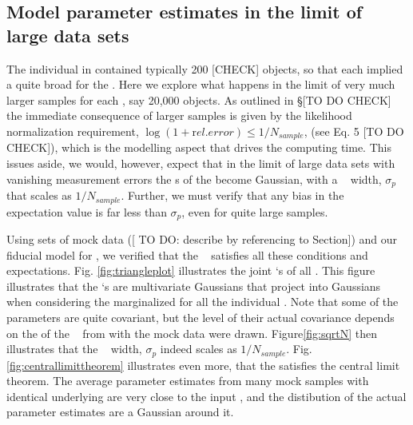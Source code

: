 \subsection{Model parameter estimates in the limit of large data sets} \label{sec:largedata}

The individual \MAP in \citet{bov13} contained typically 200 [CHECK] objects, so that each \MAP implied a quite broad \pdf  for the \pmodel .
Here we explore what happens in the limit of very much larger samples for each \MAP , say 20,000 objects. As outlined in \S [TO DO CHECK] the immediate consequence of larger samples is given by the likelihood normalization requirement, $\log(1+{\mathrm rel. error})\le 1/N_{sample}$, (see Eq. 5 [TO DO CHECK]), which is the modelling aspect that drives the computing time. This issues aside, we would, however, expect that in the limit of large data sets with vanishing measurement errors the \pdf s of the \pmodel become Gaussian, with a \pdf~ width, $\sigma_p$ that scales as $1/N_{sample}$. Further, we must verify that any bias in the \pdf~ expectation value is far less than 
$\sigma_p$, even for quite large samples.

 Using sets of mock data ([ TO DO: describe by referencing to Section]) and our fiducial model for \pmodel , we verified that the \RM~ satisfies all these conditions and expectations. Fig. \ref{fig:triangleplot} illustrates the joint \pdf `s of all \pmodel . This figure illustrates that the \pdf `s are multivariate Gaussians that project into Gaussians when considering the marginalized \pdf for all the individual \pmodel . Note that some of the parameters are quite covariant, but the level of their actual covariance depends on the of the \pmodel~ from with the mock data were drawn.  Figure\ref{fig:sqrtN} then illustrates that the \pdf~ width, $\sigma_p$ indeed scales as $1/N_{sample}$.
Fig.\ref{fig:centrallimittheorem} illustrates even more, that the \RM satisfies the central limit theorem. The average parameter estimates from many mock samples with identical underlying \pmodel are very close to the input \pmodel , and the distibution of the actual parameter estimates are a Gaussian around it. 



